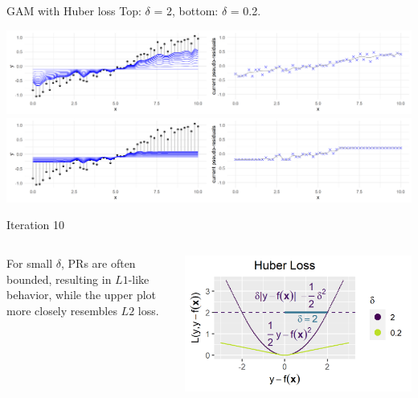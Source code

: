 \begin{frame}{GAM with Huber loss}
Top: $\delta$ = 2, bottom: $\delta$ = 0.2.

\vfill

\includegraphics[width=\textwidth]{figure/illustration_gaussian_huber_2_10.png}
\includegraphics[width=\textwidth]{figure/illustration_gaussian_huber_02_10.png}

\vfill

Iteration 10


\footnotesize
\begin{columns}[c]
\begin{column}{0.75\textwidth}
For small $\delta$, PRs are often
bounded, resulting in $L1$-like behavior, while the upper plot more closely 
resembles $L2$ loss.
\end{column}
\begin{column}{0.24\textwidth}
\includegraphics[width=1.2\textwidth]{figure/fig-loss-huber-delta.png}
\end{column}
\end{columns}

\end{frame}

